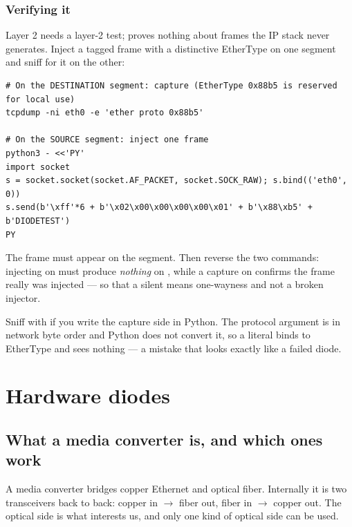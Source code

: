 \documentclass[11pt,a4paper]{article}
\begin{document}
\subsubsection{Verifying it}

Layer 2 needs a layer-2 test;  proves nothing about frames the IP
stack never generates. Inject a tagged frame with a distinctive EtherType on
one segment and sniff for it on the other:

\begin{lstlisting}[style=shell]
# On the DESTINATION segment: capture (EtherType 0x88b5 is reserved for local use)
tcpdump -ni eth0 -e 'ether proto 0x88b5'

# On the SOURCE segment: inject one frame
python3 - <<'PY'
import socket
s = socket.socket(socket.AF_PACKET, socket.SOCK_RAW); s.bind(('eth0', 0))
s.send(b'\xff'*6 + b'\x02\x00\x00\x00\x00\x01' + b'\x88\xb5' + b'DIODETEST')
PY
\end{lstlisting}

The frame must appear on the \dstside{} segment. Then reverse the two
commands: injecting on \dstside{} must produce \emph{nothing} on \srcside{},
while a capture on  confirms the frame really was injected --- so
that a silent \srcside{} means one-wayness and not a broken injector.

\begin{tipbox}
Sniff with  if you write the capture side in Python. The
 protocol argument is in network byte order and Python does
not convert it, so a literal  binds to EtherType  and sees
nothing --- a mistake that looks exactly like a failed diode.
\end{tipbox}

\section{Hardware diodes}
\label{sec:hard}

\subsection{What a media converter is, and which ones work}

A media converter bridges copper Ethernet and optical fiber. Internally it is
two transceivers back to back: copper in $\rightarrow$ fiber out, fiber in
$\rightarrow$ copper out. The optical side is what interests us, and only one
kind of optical side can be used.
\end{document}

